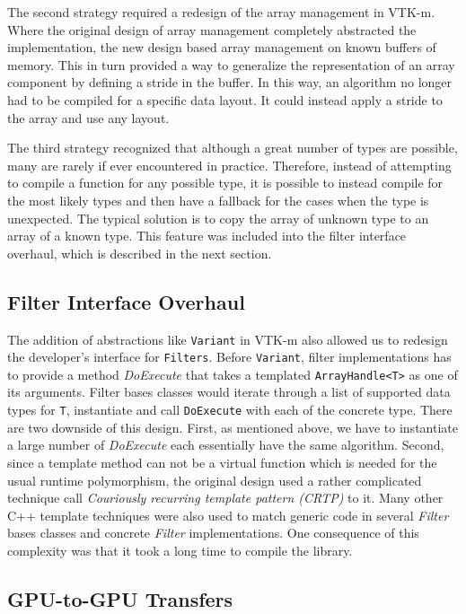 The second strategy required a redesign of the array management in VTK-m.
Where the original design of array management completely abstracted the implementation, the new design based array management on known buffers of memory.
This in turn provided a way to generalize the representation of an array component by defining a stride in the buffer.
In this way, an algorithm no longer had to be compiled for a specific data layout.
It could instead apply a stride to the array and use any layout.

The third strategy recognized that although a great number of types are possible, many are rarely if ever encountered in practice.
Therefore, instead of attempting to compile a function for any possible type, it is possible to instead compile for the most likely types and then have a fallback for the cases when the type is unexpected.
The typical solution is to copy the array of unknown type to an array of a known type.
This feature was included into the filter interface overhaul, which is described in the next section.

\subsection{Filter Interface Overhaul}


The addition of abstractions like \texttt{Variant} in VTK-m also allowed us to redesign the developer's interface for \texttt{Filters}. Before \texttt{Variant}, filter implementations has to provide a method \textit{DoExecute} that takes a templated \texttt{ArrayHandle<T>} as one of its arguments. Filter bases classes would iterate through a list of supported data types for \texttt{T}, instantiate and call \texttt{DoExecute} with each of the concrete type. There are two downside of this design. First, as mentioned above, we have to instantiate a large number of \textit{DoExecute} each essentially have the same algorithm. Second, since a template method can not be a virtual function which is needed for the usual runtime polymorphism, the original design used a rather complicated technique call \emph{Couriously recurring template pattern (CRTP)} to it. Many other C++ template techniques were also used to match generic code in several \textit{Filter} bases classes and concrete \textit{Filter} implementations. One consequence of this complexity was that it took a long time to compile the library. 

\subsection{GPU-to-GPU Transfers}

